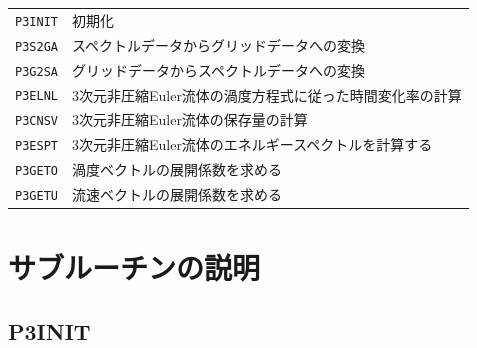 \documentclass[a4j,fleqn]{jarticle}
\begin{document}
\vspace{1em}
\begin{tabular}{ll}
{\tt P3INIT} & 初期化\\
{\tt P3S2GA} & スペクトルデータからグリッドデータへの変換\\
{\tt P3G2SA} & グリッドデータからスペクトルデータへの変換\\
{\tt P3ELNL} & 3次元非圧縮Euler流体の渦度方程式に従った時間変化率の計算\\
{\tt P3CNSV} & 3次元非圧縮Euler流体の保存量の計算\\
{\tt P3ESPT} & 3次元非圧縮Euler流体のエネルギースペクトルを計算する\\
{\tt P3GETO} & 渦度ベクトルの展開係数を求める\\
{\tt P3GETU} & 流速ベクトルの展開係数を求める
\end{tabular}


\section{サブルーチンの説明}

\subsection{P3INIT}
\end{document}
